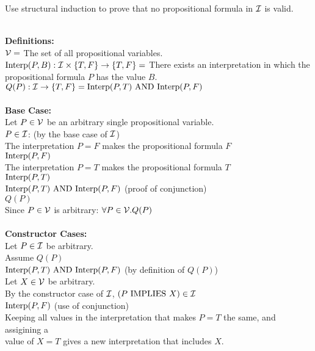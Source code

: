 \documentclass[11pt]{article}
\newcommand{\Implies}{\mbox{ IMPLIES }}
\newcommand{\And}{\mbox{ AND }}
\begin{document}
\begin{enumerate}
\begin{question}
Use structural induction to prove that no propositional formula in ${\cal I}$ is valid.\\\\
\end{question}
{\bf Definitions:}\\
${\cal V} = $ The set of all propositional variables. \\
$ {\rm Interp}(P, B): {\cal I} \times \{T,F\} \rightarrow \{T,F\} = $ There exists an interpretation in which the propositional formula $P$ has the value $B$.\\
$Q(P): {\cal I} \rightarrow \{T,F\} = {\rm Interp}(P, T) \And {\rm Interp}(P, F)$\\\\
{\bf Base Case:}\\
\null\quad Let $P\in {\cal V}$ be an arbitrary single propositional variable.\\
\null\quad $P\in {\cal I }$: (by the base case of ${\cal I}$) \\
\null\quad The interpretation $P = F$ makes the propositional formula $F$ \\
\null\quad ${\rm Interp}(P, F)$\\
\null\quad The interpretation $P = T$ makes the propositional formula $T$ \\
\null\quad ${\rm Interp}(P, T)$\\
\null\quad ${\rm Interp}(P, T) \And {\rm Interp}(P, F)$ (proof of conjunction)\\
\null\quad $Q(P)$\\
Since $P\in {\cal V}$ is arbitrary: $\forall P\in {\cal V}.  Q(P)$\\\\
{\bf Constructor Cases:}\\
\null\quad Let $P\in {\cal I}$ be arbitrary.\\
\null\qquad Assume $Q(P)$\\
\null\qquad ${\rm Interp}(P, T) \And {\rm Interp}(P, F)$ (by definition of $Q(P)$)\\
\null\qquad\quad Let $X\in{\cal V}$ be arbitrary.\\
\null\qquad\quad By the constructor case of ${\cal I}$, $(P\Implies X)\in {\cal I}$\\
\null\qquad\quad ${\rm Interp}(P, F)$ (use of conjunction)\\
\null\qquad\quad Keeping all values in the interpretation that makes $P = T$ the same, and assigining a\\
\null\qquad\quad value of $X= T$ gives a new interpretation that includes $X$.\\

\end{enumerate}
\end{document}
